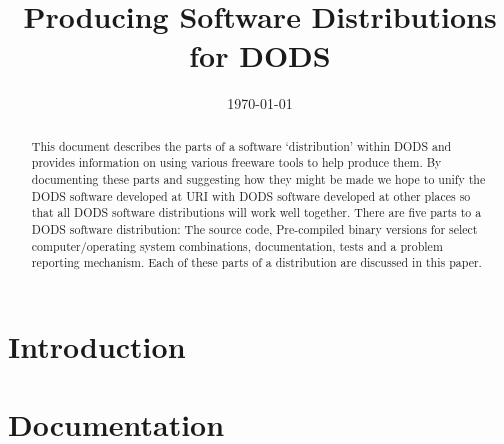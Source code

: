 
%       







\title{Producing Software Distributions for DODS}
\author{}
\date{\today}

\maketitle

\begin{abstract}
 
  This document describes the parts of a software `distribution' within DODS
  and provides information on using various freeware tools to help produce
  them. By documenting these parts and suggesting how they might be made we
  hope to unify the DODS software developed at URI with DODS software
  developed at other places so that all DODS software distributions will work
  well together. There are five parts to a DODS software distribution: The
  source code, Pre-compiled binary versions for select computer/operating
  system combinations, documentation, tests and a problem reporting
  mechanism. Each of these parts of a distribution are discussed in this
  paper.

\end{abstract}



\begin{htmlonly}
\end{htmlonly}

\clearpage

\tableofcontents

\clearpage

\section{Introduction}
\label{introduction}

\section{Documentation}

